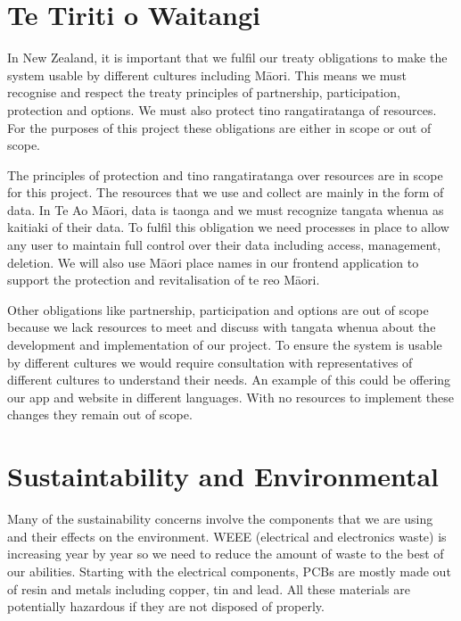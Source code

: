 \section{Te Tiriti o Waitangi}

In New Zealand, it is important that we fulfil our treaty obligations to make the system usable by different cultures including Māori. This means we must recognise and respect the treaty principles of partnership, participation, protection and options. We must also protect tino rangatiratanga of resources. For the purposes of this project these obligations are either in scope or out of scope. 

The principles of protection and tino rangatiratanga over resources are in scope for this project. The resources that we use and collect are mainly in the form of data. In Te Ao Māori, data is taonga and we must recognize tangata whenua as kaitiaki of their data. To fulfil this obligation we need processes in place to allow any user to maintain full control over their data including access, management, deletion. We will also use Māori place names in our frontend application to support the protection and revitalisation of te reo Māori.  
 
Other obligations like partnership, participation and options are out of scope because we lack resources to meet and discuss with tangata whenua about the development and implementation of our project. To ensure the system is usable by different cultures we would require consultation with representatives of different cultures to understand their needs. An example of this could be offering our app and website in different languages. With no resources to implement these changes they remain out of scope.


\section{Sustaintability and Environmental}

Many of the sustainability concerns involve the components that we are using and their effects on the environment. WEEE (electrical and electronics waste) is increasing year by year so we need to reduce the amount of waste to the best of our abilities. Starting with the electrical components, PCBs are mostly made out of resin and metals including copper, tin and lead. All these materials are potentially hazardous if they are not disposed of properly.

